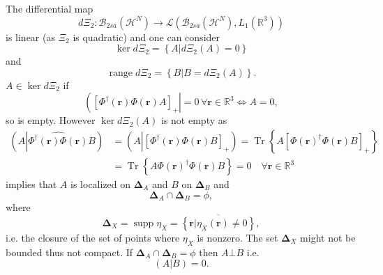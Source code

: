 \documentclass[aps,preprint]{revtex4}%
\begin{document}
The differential map
\begin{equation}
d\Xi_{2}:\mathcal{B}_{2sa}\left(  \mathcal{H}^{N}\right)  \rightarrow
\mathcal{L}\left(  \mathcal{B}_{2sa}\left(  \mathcal{H}^{N}\right)
,L_{1}\left(  \mathbb{R}^{3}\right)  \right)
\end{equation}
is linear (as $\Xi_{2}$ is quadratic) and one can consider
\begin{equation}
\ker d\Xi_{2}=\left\{  \left.  A\right\vert d\Xi_{2}\left(  A\right)
=0\right\}
\end{equation}
and
\begin{equation}
\operatorname{range}d\Xi_{2}=\left\{  \left.  B\right\vert B=d\Xi_{2}\left(
A\right)  \right\}  .
\end{equation}
$A\in\ker d\Xi_{2}$ if
\begin{equation}
\left(  \left[  \Phi^{\dagger}\left(  \boldsymbol{r}\right)  \Phi\left(
\boldsymbol{r}\right)  A\right]  _{+}\right\vert =0\,\forall\boldsymbol{r\in
}\mathbb{R}^{3}\Longleftrightarrow A=0,
\end{equation}
so is empty. However $\ker d\Xi_{2}\left(  A\right)  $ is not empty as
\begin{align}
\left(  A\left\vert \widehat{\Phi^{\dagger}\left(  \boldsymbol{r}\right)
\Phi\left(  \boldsymbol{r}\right)  }B\right.  \right)   &  =\left(
A\left\vert \left[  \Phi^{\dagger}\left(  \boldsymbol{r}\right)  \Phi\left(
\boldsymbol{r}\right)  B\right]  _{+}\right.  \right)  =\operatorname{Tr}%
\left\{  A\left[  \Phi\left(  \boldsymbol{r}\right)  ^{\dagger}\Phi\left(
\boldsymbol{r}\right)  B\right]  _{+}\right\} \nonumber\\
&  =\operatorname{Tr}\left\{  A\Phi\left(  \boldsymbol{r}\right)  ^{\dagger
}\Phi\left(  \boldsymbol{r}\right)  B\right\}  =0\quad\forall\boldsymbol{r}%
\in\mathbb{R}^{3}%
\end{align}
implies that $A$ is localized on $\boldsymbol{\Delta}_{A}$ and $B$ on
$\boldsymbol{\Delta}_{B}$ and
\begin{equation}
\boldsymbol{\Delta}_{A}\cap\boldsymbol{\Delta}_{B}=\phi,
\end{equation}
where
\begin{equation}
\boldsymbol{\Delta}_{X}=\operatorname*{supp}\eta_{X}=\overline{\left\{
\left.  \mathbf{r}\right\vert \eta_{X}\left(  \mathbf{r}\right)
\neq0\right\}  },
\end{equation}
i.e. the closure of the set of points where $\eta_{X}$ is nonzero. The set
$\boldsymbol{\Delta}_{X}$ might not be bounded thus not compact. If
$\boldsymbol{\Delta}_{A}\cap\boldsymbol{\Delta}_{B}=\phi$ then $A\bot B$ i.e.
\begin{equation}
\left(  \left.  A\right\vert B\right)  =0.
\end{equation}
\end{document}
